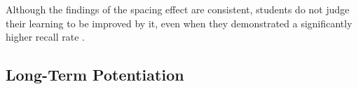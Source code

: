 Although the findings of the spacing effect are consistent, students do not judge their learning to be improved by it, even when they demonstrated a significantly higher recall rate \cite{logan}.



\subsection{Long-Term Potentiation}



